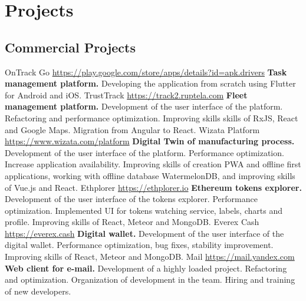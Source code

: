 \documentclass[11pt,a4paper]{moderncv}
\begin{document}
\newpage

\section{Projects}
  \subsection{Commercial Projects}
  \cvline
    {OnTrack Go}
    {\url{https://play.google.com/store/apps/details?id=apk.drivers}\newline{}
    \textbf{Task management platform.}\newline{}
    Developing the application from scratch using Flutter for Android and iOS.}
  \cvline
    {TrustTrack}
    {\url{https://track2.ruptela.com}\newline{}
    \textbf{Fleet management platform.}\newline{}
    Development of the user interface of the platform. Refactoring and performance optimization.
    Improving skills skills of RxJS, React and Google Maps. Migration from Angular to React.}
  \cvline
    {Wizata Platform}
    {\url{https://www.wizata.com/platform}\newline{}
    \textbf{Digital Twin of manufacturing process.}\newline{}
    Development of the user interface of the platform. Performance optimization. Increase application availability.\newline{}
    Improving skills of creation PWA and offline first applications, working with offline database WatermelonDB, and improving skills of Vue.js and React.}
  \cvline
    {Ethplorer}
    {\url{https://ethplorer.io}\newline{}
    \textbf{Ethereum tokens explorer.}\newline{}
    Development of the user interface of the tokens explorer. Performance optimization. Implemented UI for tokens watching service, labels, charts and profile.\newline{}
    Improving skills of React, Meteor and MongoDB.}
  \cvline
    {Everex Cash}
    {\url{https://everex.cash}\newline{}
    \textbf{Digital wallet.}\newline{}
    Development of the user interface of the digital wallet. Performance optimization, bug fixes, stability improvement.\newline{}
    Improving skills of React, Meteor and MongoDB.}
  \cvline
    {Mail}
    {\url{https://mail.yandex.com}\newline{}
    \textbf{Web client for e-mail.}\newline{}
    Development of a highly loaded project. Refactoring and optimization.\newline{}
    Organization of development in the team. Hiring and training of new developers.}
\end{document}
